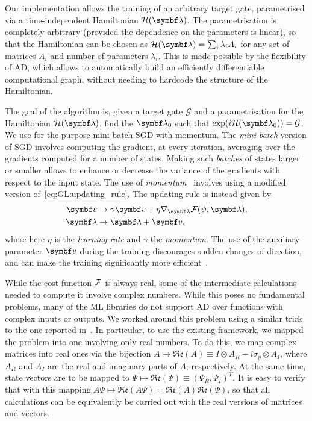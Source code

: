 Our implementation allows the training of an arbitrary target gate, parametrised via a time-independent Hamiltonian $\mathcal H(\bs\lambda)$.
The parametrisation is completely arbitrary (provided the dependence on the parameters is linear), so that the Hamiltonian can be chosen as $\mathcal H(\bs\lambda)=\sum_i \lambda_i A_i$ for any set of matrices $A_i$ and number of parameters $\lambda_i$.
This is made possible by the flexibility of \ac{AD}, which allows to automatically build an efficiently differentiable computational graph, without needing to hardcode the structure of the Hamiltonian.

The goal of the algorithm is, given a target gate $\mathcal G$ and a parametrisation for the Hamiltonian $\mathcal H(\bs\lambda)$, find the $\bs\lambda_0$ such that $\exp(i\mathcal H(\bs\lambda_0))=\mathcal G$.
We use for the purpose mini-batch \ac{SGD} with momentum.
The \emph{mini-batch} version of \ac{SGD} involves computing the gradient, at every iteration, averaging over the gradients computed for a number of states.
Making such \emph{batches} of states larger or smaller allows to enhance or decrease the variance of the gradients with respect to the input state.
The use of \emph{momentum}~\cite{ruder2016overview,goh2017momentum} involves using a modified version of~\cref{eq:GL:updating_rule}.
The updating rule is instead given by
\begin{equation}
\begin{aligned}
	\bs v &\to \gamma \bs v + \eta \grad_{\bs\lambda} \calF(\psi, \bs\lambda), \\
	\bs\lambda &\to \bs\lambda + \bs v,
\end{aligned}
\label{eq:GL:updating_rule_momentum}
\end{equation}
where here $\eta$ is the \emph{learning rate} and $\gamma$ the \emph{momentum}.
The use of the auxiliary parameter $\bs v$ during the training discourages sudden changes of direction, and can make the training significantly more efficient~\cite{goh2017momentum}.

While the cost function ${\mathcal{F}}$ is always real, some of the intermediate calculations needed to compute it involve complex numbers.
While this poses no fundamental problems, many of the \ac{ML} libraries do not support \ac{AD} over functions with complex inputs or outputs.
We worked around this problem using a similar trick to the one reported in~\cite{leung2017speedup}.
In particular, to use the existing framework, we mapped the problem into one involving only real numbers.
To do this, we map complex matrices into real ones via the bijection
$A\mapsto\mathfrak{Re}(A)\equiv I \otimes A_{R} - i \sigma_y\otimes A_{I}$,
where $A_R$ and $A_I$ are the real and imaginary parts of $A$, respectively.
At the same time, state vectors are to be mapped to
$\Psi\mapsto\mathfrak{Re}(\Psi)\equiv(\Psi_R, \Psi_I)^T$.
It is easy to verify that with this mapping
$A\Psi\mapsto\mathfrak{Re}(A\Psi)=\mathfrak{Re}(A)\mathfrak{Re}(\Psi)$,
so that all calculations can be equivalently be carried out with the real versions of matrices and vectors.

